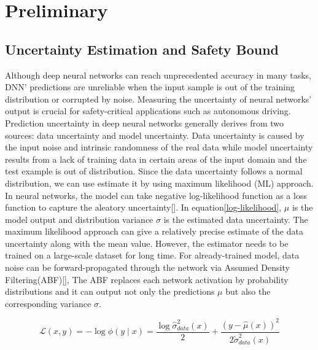 \section{Preliminary}\label{sec:pre}


\subsection{Uncertainty Estimation and Safety Bound}
Although deep neural networks can reach unprecedented accuracy in many tasks, DNN' predictions are unreliable when the input sample is out of the training distribution or corrupted by noise. Measuring the uncertainty of neural networks' output is crucial for safety-critical applications such as  autonomous driving. Prediction uncertainty in deep neural networks generally derives from two sources: data uncertainty and model uncertainty. Data uncertainty is caused by the input noise and intrinsic randomness of the real data while model uncertainty results from a lack of training data in certain areas of the input domain and the test example is out of distribution.  Since the data uncertainty follows a normal distribution, we can use estimate it by using maximum likelihood (ML) approach. In neural networks, the model can take negative log-likelihood function as a loss function to capture the aleatory uncertainty[]. In equation\eqref{log-likelihood}, $\mu$ is the model output and distribution variance $\sigma$ is the estimated data uncertainty. The maximum likelihood approach can give a relatively precise estimate of the data uncertainty along with the mean value. However, the estimator needs to be trained on a large-scale dataset for long time. For already-trained model, data noise can be forward-propagated through the network via Assumed Density Filtering(ABF)[], The ABF replaces each network activation by probability distributions and it can output not only the predictions $\mu$ but also the corresponding variance $\sigma$.  

\begin{equation}
\mathcal{L}(x, y)=-\log \phi(y \mid x)=\frac{\log \hat{\sigma}^{2}_{data}(x)}{2}+\frac{(y-\hat{\mu}(x))^{2}}{2 \tilde{\sigma}^{2}_{data}(x)}\label{log-likelihood}
\end{equation}

